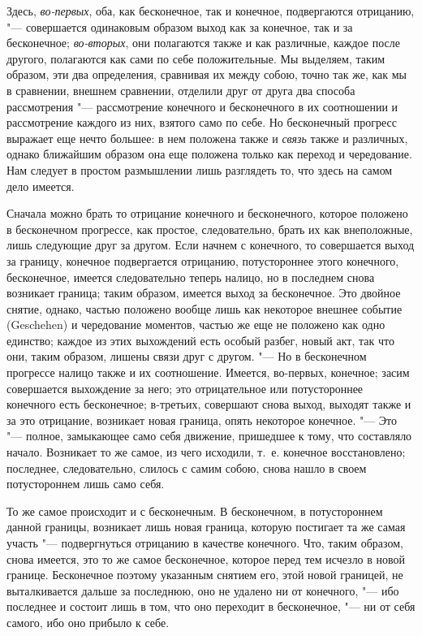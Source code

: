 Здесь, {\em во-первых}, оба, как бесконечное, так и
конечное, подвергаются отрицанию, "--- совершается одинаковым образом выход
как за конечное, так и за бесконечное; {\em во-вторых},
они полагаются также и как различные, каждое после другого, полагаются как
сами по себе положительные. Мы выделяем, таким образом, эти два
определения, сравнивая их между собою, точно так же, как мы в сравнении,
внешнем сравнении, отделили друг от друга два способа рассмотрения
"--- рассмотрение конечного и бесконечного в их соотношении и рассмотрение
каждого из них, взятого само по себе. Но бесконечный прогресс выражает еще
нечто большее: в нем положена также и {\em связь} также
и различных, однако ближайшим образом она еще положена только как переход и
чередование. Нам следует в простом размышлении лишь разглядеть то, что
здесь на самом дело имеется.

Сначала можно брать то отрицание конечного и бесконечного, которое положено
в бесконечном прогрессе, как простое, следовательно, брать их как
внеположные, лишь следующие друг за другом. Если начнем с конечного, то
совершается выход за границу, конечное подвергается отрицанию,
потустороннее этого конечного, бесконечное, имеется следовательно теперь
налицо, но в последнем снова возникает граница; таким образом, имеется
выход за бесконечное. Это двойное снятие, однако, частью положено вообще
лишь как некоторое внешнее событие (Geschehen) и чередование моментов,
частью же еще не положено как одно единство; каждое из этих выхождений есть
особый разбег, новый акт, так что они, таким образом, лишены связи друг с
другом. "--- Но в бесконечном прогрессе налицо также и их соотношение.
Имеется, во-первых, конечное; засим совершается выхождение за него; это
отрицательное или потустороннее конечного есть бесконечное; в-третьих,
совершают снова выход, выходят также и за это отрицание, возникает новая
граница, опять некоторое конечное. "--- Это "--- полное, замыкающее само себя
движение, пришедшее к тому, что составляло начало. Возникает то же самое,
из чего исходили, т.~е. конечное восстановлено; последнее, следовательно,
слилось с самим собою, снова нашло в своем потустороннем лишь само себя.

То же самое происходит и с бесконечным. В бесконечном, в потустороннем
данной границы, возникает лишь новая граница, которую постигает та же самая
участь "--- подвергнуться отрицанию в качестве конечного. Что, таким образом,
снова имеется, это то же самое бесконечное, которое перед тем исчезло в
новой границе. Бесконечное поэтому указанным снятием его, этой новой
границей, не выталкивается дальше за последнюю, оно не удалено ни от
конечного, "--- ибо последнее и состоит лишь в том, что оно переходит в
бесконечное, "--- ни от себя самого, ибо оно прибыло к себе.

